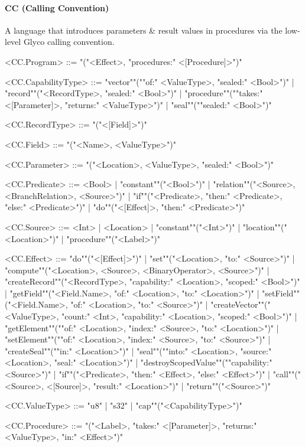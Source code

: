 \documentclass[main.tex]{subfiles}
\begin{document}
\paragraph{ CC (Calling Convention) } A language that introduces parameters \& result values in procedures via the low-level Glyco calling convention.
\begin{grammar}
	\footnotesize
				<CC.Program> ::=
							"("<Effect>, "procedures:" <[Procedure]>")"
				\par
				<CC.CapabilityType> ::=
						"vector""(""of:" <ValueType>, "sealed:" <Bool>")"
						| "record""("<RecordType>, "sealed:" <Bool>")"
						| "procedure""(""takes:" <[Parameter]>, "returns:" <ValueType>")"
						| "seal""(""sealed:" <Bool>")"
				\par
				<CC.RecordType> ::=
							"("<[Field]>")"
				\par
				<CC.Field> ::=
							"("<Name>, <ValueType>")"
				\par
				<CC.Parameter> ::=
							"("<Location>, <ValueType>, "sealed:" <Bool>")"
				\par
				<CC.Predicate> ::=
						<Bool> |
						"constant""("<Bool>")"
						| "relation""("<Source>, <BranchRelation>, <Source>")"
						| "if""("<Predicate>, "then:" <Predicate>, "else:" <Predicate>")"
						| "do""("<[Effect]>, "then:" <Predicate>")"
				\par
				<CC.Source> ::=
						<Int> |
								<Location> |
						"constant""("<Int>")"
						| "location""("<Location>")"
						| "procedure""("<Label>")"
				\par
				<CC.Effect> ::=
						"do""("<[Effect]>")"
						| "set""("<Location>, "to:" <Source>")"
						| "compute""("<Location>, <Source>, <BinaryOperator>, <Source>")"
						| "createRecord""("<RecordType>, "capability:" <Location>, "scoped:" <Bool>")"
						| "getField""("<Field.Name>, "of:" <Location>, "to:" <Location>")"
						| "setField""("<Field.Name>, "of:" <Location>, "to:" <Source>")"
						| "createVector""("<ValueType>, "count:" <Int>, "capability:" <Location>, "scoped:" <Bool>")"
						| "getElement""(""of:" <Location>, "index:" <Source>, "to:" <Location>")"
						| "setElement""(""of:" <Location>, "index:" <Source>, "to:" <Source>")"
						| "createSeal""(""in:" <Location>")"
						| "seal""(""into:" <Location>, "source:" <Location>, "seal:" <Location>")"
						| "destroyScopedValue""(""capability:" <Source>")"
						| "if""("<Predicate>, "then:" <Effect>, "else:" <Effect>")"
						| "call""("<Source>, <[Source]>, "result:" <Location>")"
						| "return""("<Source>")"
				\par
				<CC.ValueType> ::=
						"u8"
						| "s32"
						| "cap""("<CapabilityType>")"
				\par
				<CC.Procedure> ::=
							"("<Label>, "takes:" <[Parameter]>, "returns:" <ValueType>, "in:" <Effect>")"
				\par
\end{grammar}
\par
\end{document}
